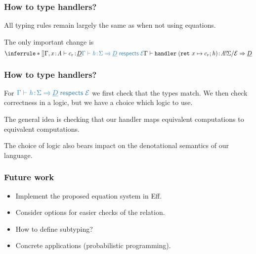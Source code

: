 \documentclass[usenames,dvipsnames]{beamer}
\begin{document}
\begin{frame}
	\frametitle{How to type handlers?}
	All typing rules remain largely the same as when not using equations.

	\vspace{5mm}

	The only important change is
	\[
		\inferrule*[]
		{
			\judgement{\ctx, x \oftype \tyA}{c_r}{\ctyD}
			\\
			\new{\respects{\hcases}{\eqE}{\sig}{\ctyD}}
			\\
		}
		{\judgement{\ctx}
			{\handler{\hcases}}
			{\ctype{\tyA}{\sig}{\eqE} \hto \ctyD}
		}
	\]

\end{frame}
\begin{frame}
	\frametitle{How to type handlers?}
	
	For $\new{\respects{\hcases}{\eqE}{\sig}{\ctyD}}$ we first check that the types match. We then check correctness in a logic, but we have a choice which logic to use.

	\vspace{5mm}

	The general idea is checking that our handler maps equivalent computations to equivalent computations.

	\vspace{5mm}

	The choice of logic also bears impact on the denotational semantics of our language.

\end{frame}
\begin{frame}
	\frametitle{Future work}
	
	\begin{itemize}
		\item Implement the proposed equation system in Eff.
		\item Consider options for easier checks of the  relation.
		\item How to define subtyping?
		\item Concrete applications (probabilistic programming).
	\end{itemize}

\end{frame}
\end{document}
